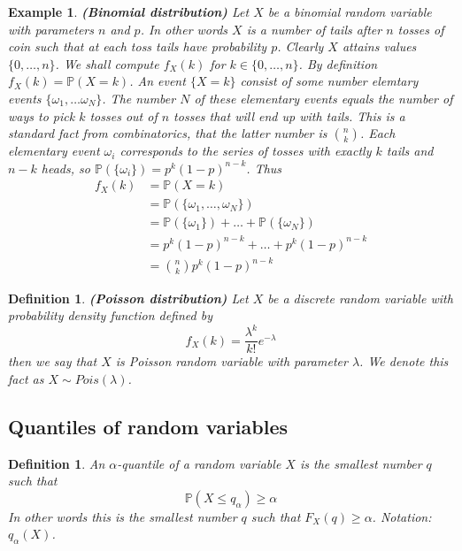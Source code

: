 \documentclass[12pt]{article}
\newtheorem{definition}[theorem]{Definition}
\newtheorem{example}[theorem]{Example}
\begin{document}
\begin{example} \textbf{(Binomial distribution)} Let $X$ be a binomial random variable with parameters $n$ and $p$. In other words $X$ is a number of tails after $n$ tosses of coin such that at each toss tails have probability $p$. Clearly $X$ attains values $\{0,\ldots,n\}$. We shall compute $f_X(k)$ for $k\in\{0,\ldots,n\}$. By definition $f_X(k)=\mathbb{P}(X=k)$. An event 
$\{X=k\}$ consist of some number elemtary events $\{\omega_1,\ldots\omega_N\}$. The number $N$ of these elementary events equals the number of ways to pick $k$ tosses out of $n$ tosses that will end up with tails. This is a standard fact from combinatorics, that the latter number is ${n \choose k}$. Each elementary event $\omega_i$ corresponds to the series of tosses with exactly $k$ tails and $n-k$ heads, so $\mathbb{P}(\{\omega_i\})=p^k(1-p)^{n-k}$. Thus
\begin{align*}
f_X(k)
&=\mathbb{P}(X=k)\\
&=\mathbb{P}(\{\omega_1,\ldots,\omega_N\})\\
&=\mathbb{P}(\{\omega_1\})+\ldots+\mathbb{P}(\{\omega_N\})\\
&=p^k(1-p)^{n-k}+\ldots+p^k(1-p)^{n-k}\\
&={n\choose k}p^k(1-p)^{n-k}
\end{align*}
\end{example}

\begin{definition} \textbf{(Poisson distribution)} Let $X$ be a discrete random variable with probability density function defined by
$$
f_X(k)=\frac{\lambda^k}{k!}e^{-\lambda}
$$
then we say that $X$ is Poisson random variable with parameter $\lambda$. We denote this fact as $X\sim Pois(\lambda)$.
\end{definition}


\subsection{Quantiles of random variables}

\begin{definition} An $\alpha$-quantile of a random variable $X$ is the smallest number $q$ such that
$$
\mathbb{P}(X\leq q_\alpha)\geq\alpha
$$
In other words this is the smallest number $q$ such that $F_X(q)\geq \alpha$. Notation: $q_\alpha(X)$.
\end{definition}
\end{document}
